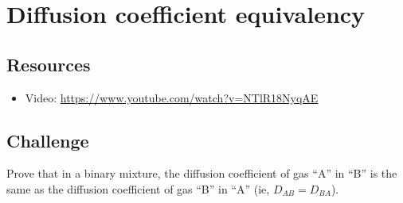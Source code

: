 \newpage
\section{Diffusion coefficient equivalency}

\subsection*{Resources}
\begin{itemize}
    \item Video: \url{https://www.youtube.com/watch?v=NTlR18NyqAE}
\end{itemize}

\subsection*{Challenge}
Prove that in a binary mixture, the diffusion coefficient of gas ``A'' in ``B'' is the same as the diffusion coefficient of gas ``B'' in ``A'' (ie, $D_{AB} = D_{BA}$).
